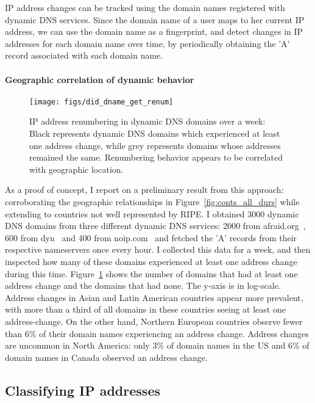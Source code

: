 IP address changes can be tracked using the domain names
registered with dynamic DNS services. Since the domain name of a user
maps to her current IP address, we can use the domain name as a
fingerprint, and detect changes in IP addresses for each domain name
over time, by periodically obtaining the 'A' record associated with
each domain name. 

\paragraph{Geographic correlation of dynamic behavior}

\begin{figure}[tb]
\begin{center}
\texttt{[image: figs/did\_dname\_get\_renum]}
\end{center}
\caption{\label{fig:addr_change_per_ctry}
IP address renumbering in dynamic DNS domains over a week: Black
represents dynamic DNS domains which experienced at least one address
change, while grey represents domains whose addresses remained the
same. Renumbering behavior appears to be correlated with geographic
location.}
\end{figure}

As a proof of concept, I report on a preliminary result from this
approach: corroborating the geographic relationships in Figure~\ref{fig:conts_all_durs} 
while extending to countries not well represented by RIPE.
I
obtained 3000 dynamic DNS domains from three different dynamic DNS
services: 2000 from afraid.org~\cite{afraid}, 600 from dyn~\cite{dyn} and 400 from
noip.com~\cite{noip} and fetched the 'A' records from their respective
nameservers once every hour. I collected this data for a week, and
then inspected how many of these domains experienced at least one
address change during this time. Figure~\ref{fig:addr_change_per_ctry}
shows the number of domains that had at least one 
address change and the domains that had none. The y-axis is in log-scale. 
Address changes in Asian and Latin American countries appear
more prevalent, with more than a third of all domains in these
countries seeing at least one address-change. On the other hand,
Northern European countries observe fewer than 6\% of their domain names
experiencing an address change. Address changes are uncommon in
North America: only 3\% of domain names in the US and 6\% of domain
names in Canada observed an address change.



\subsection{Classifying IP addresses}

